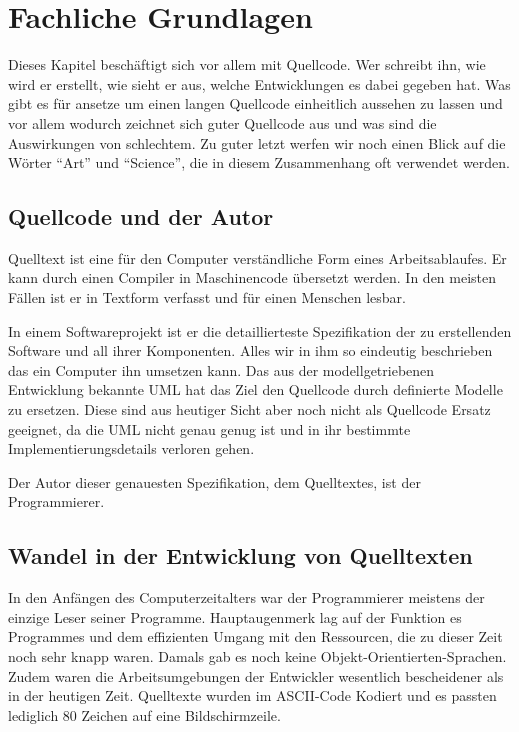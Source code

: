 
\section{Fachliche Grundlagen}

Dieses Kapitel beschäftigt sich vor allem mit Quellcode. Wer schreibt ihn, wie wird er erstellt, wie sieht er aus, welche Entwicklungen es dabei gegeben hat. Was gibt es für ansetze um einen langen Quellcode einheitlich aussehen zu lassen und vor allem wodurch zeichnet sich guter Quellcode aus und was sind die Auswirkungen von schlechtem. Zu guter letzt werfen wir noch einen Blick auf die Wörter \enquote{Art} und \enquote{Science}, die in diesem Zusammenhang oft verwendet werden.

\subsection{Quellcode und der Autor}

Quelltext ist eine für den Computer verständliche Form
eines Arbeitsablaufes. Er kann durch einen Compiler in Maschinencode übersetzt werden.
In den meisten Fällen ist er in Textform verfasst und für einen Menschen lesbar.

In einem Softwareprojekt ist er die detaillierteste Spezifikation der zu erstellenden
Software und all ihrer Komponenten. Alles wir in ihm so eindeutig beschrieben
das ein Computer ihn umsetzen kann. Das aus der modellgetriebenen Entwicklung
bekannte UML hat das Ziel den Quellcode durch definierte Modelle zu ersetzen.
Diese sind aus heutiger Sicht aber noch nicht als Quellcode Ersatz geeignet,
da die UML nicht genau genug ist und in ihr bestimmte Implementierungsdetails verloren gehen.
 \cite[S. 26]{Martin}

Der Autor dieser genauesten Spezifikation, dem Quelltextes, ist der Programmierer.

\subsection{Wandel in der Entwicklung von Quelltexten}


In den Anfängen des Computerzeitalters war der Programmierer meistens der einzige
Leser seiner Programme. Hauptaugenmerk lag auf der Funktion es Programmes
und dem effizienten Umgang mit den Ressourcen, die zu dieser Zeit noch sehr knapp waren.
 Damals gab es noch keine Objekt-Orientierten-Sprachen. Zudem waren die Arbeitsumgebungen der Entwickler
wesentlich bescheidener als in der heutigen Zeit. Quelltexte wurden im ASCII-Code
Kodiert und es passten lediglich 80 Zeichen auf eine Bildschirmzeile.

